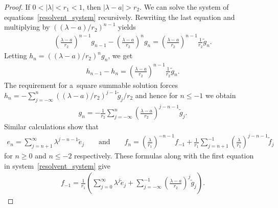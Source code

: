 \documentclass[pdftex]{sigma}
\numberwithin{equation}{section}
\begin{document}
\begin{proof}
If $0<|\lambda|<r_1<1$, then $|\lambda-a|>r_2$.
We can solve the system of equations~\eqref{resolvent_system} recursively.
Rewriting the last equation and multiplying by $((\lambda-a)/r_2)^{n-1}$ yields
\begin{gather*}
\left(\frac{\lambda-a}{r_2}\right)^{n-1}g_{n-1}-\left(\frac{\lambda-a}{r_2}\right)^ng_n
=\left(\frac{\lambda-a}{r_2}\right)^{n-1}\frac{1}{r_2}\tilde{g}_n.
\end{gather*}
Letting $h_n=((\lambda-a)/r_2)^ng_n$, we get
\begin{gather*}
h_{n-1}-h_n=\left(\frac{\lambda-a}{r_2}\right)^{n-1}\frac{1}{r_2}\tilde{g}_n.
\end{gather*}
The requirement for a~square summable solution forces $h_n =
-\sum\limits_{j=-\infty}^n((\lambda-a)/r_2)^{j-1}\tilde{g}_j/r_2$ and hence for $n\le-1$ we obtain
\begin{gather*}
g_n=-\frac{1}{r_2}\sum\limits_{j=-\infty}^n\left(\frac{\lambda-a}{r_2}\right)^{j-n-1}\tilde{g}_j.
\end{gather*}
Similar calculations show that
\begin{gather*}
e_n=\sum\limits_{j=n+1}^\infty \lambda^{j-n-1}\tilde{e}_j
\qquad
\text{and}
\qquad
f_n=\left(\frac{\lambda}{r_1}\right)^{-n-1}f_{-1}+\frac{1}{r_1}\sum\limits_{j=n+1}^{-1}\left(\frac{\lambda}{r_1}\right)^{j-n-1}\tilde{f}_j
\end{gather*}
for $n\ge0$ and $n\le-2$ respectively.
These formulas along with the f\/irst equation in system~\eqref{resolvent_system} give
\begin{gather*}
f_{-1}=\frac{1}{r_1}\left(\sum\limits_{j=0}^\infty\lambda^j\tilde{e}_j+\sum\limits_{j=-\infty}^{-1}\left(\frac{\lambda
- a}{r_2}\right)^j\tilde{g}_j\right).
\end{gather*}


\end{proof}
\end{document}
